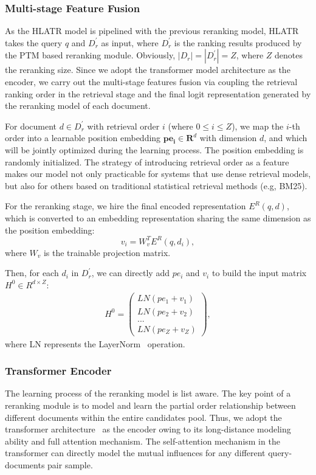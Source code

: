 \documentclass[11pt]{article}
\begin{document}
\subsubsection{Multi-stage Feature Fusion}
As the HLATR model is pipelined with the previous reranking model, HLATR takes the query $q$ and $D_r^{'}$ as input, where $D_r^{'}$ is the ranking results produced by the PTM based reranking module. Obviously, $|D_r| = |D_r^{'}| = Z$, where $Z$ denotes the reranking size. Since we adopt the transformer model architecture as the encoder, we carry out the multi-stage features fusion via coupling the retrieval ranking order in the retrieval stage and the final logit representation generated by the reranking model of each document.

For document $d\in D_r^{'}$ with retrieval order $i$ (where $0 \leq i \leq Z$), we map the $i$-th order into a learnable position embedding $\mathbf{pe_{i}} \in {\mathbf{R}^{d}}$ with dimension $d$, and which will be jointly optimized during the learning process. The position embedding is randomly initialized. The strategy of introducing retrieval order as a feature makes our model not only practicable for systems that use dense retrieval models, but also for others based on traditional statistical retrieval methods (e.g, BM25).

For the reranking stage, we hire the final encoded representation $E^R(q,d)$, which is converted to an embedding representation sharing the same dimension as the position embedding:
\begin{equation}
    v_i = W_{v}^TE^R(q,d_i),
\end{equation}
where $W_{v}$ is the trainable projection matrix.


Then, for each $d_i$ in $D_r^{'}$, we can directly add $pe_{i}$ and $v_i$ to build the input matrix $H^0 \in R^{d \times Z}$:
\begin{align*}
    H^0 = \begin{pmatrix} LN(pe_{1} + v_1) \\  LN(pe_{2} + v_2) \\  ... \\  LN(pe_{Z}+v_Z)
    \end{pmatrix},
\end{align*}
where LN represents the LayerNorm~\cite{ba2016layer} operation.


\subsubsection{Transformer Encoder} 
The learning process of the reranking model is list aware. The key point of a reranking module is to model and learn the partial order relationship between different documents within the entire candidates pool. Thus, we adopt the transformer architecture~\cite{vaswani2017attention} as the encoder owing to its long-distance modeling ability and full attention mechanism. The self-attention mechanism in the transformer can directly model the mutual influences for any different query-documents pair sample.
\end{document}
